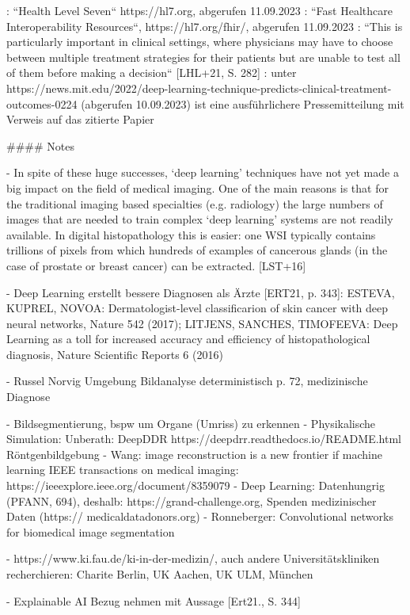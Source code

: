 \footnotemark[26]: ``Health Level Seven`` https://hl7.org, abgerufen 11.09.2023
\footnotemark[27]: ``Fast Healthcare Interoperability Resources``, https://hl7.org/fhir/, abgerufen 11.09.2023
\footnotemark[28]: ``This is particularly important in clinical settings, where physicians may have to choose between multiple treatment strategies for their patients but are unable to test all of them before making a decision``  [LHL+21, S. 282]
\footnotemark[29]: unter https://news.mit.edu/2022/deep-learning-technique-predicts-clinical-treatment-outcomes-0224 (abgerufen 10.09.2023) ist eine ausführlichere Pressemitteilung mit Verweis auf das zitierte Papier


#### Notes

- In spite of these huge successes, ‘deep learning’ techniques have not yet made a big impact on the field of medical imaging. One of the main reasons is that for the traditional imaging based specialties (e.g. radiology) the large numbers of images that are needed to train complex ‘deep learning’ systems are not readily available. In digital
histopathology this is easier: one WSI typically contains trillions of pixels from which hundreds of examples of
cancerous glands (in the case of prostate or breast cancer) can be extracted. [LST+16]


- Deep Learning erstellt bessere Diagnosen als Ärzte [ERT21, p. 343]: ESTEVA, KUPREL, NOVOA: Dermatologist-level classificarion of skin cancer with deep neural networks, Nature 542 (2017); LITJENS, SANCHES, TIMOFEEVA: Deep Learning as a toll for increased accuracy and efficiency of histopathological diagnosis, Nature Scientific Reports 6 (2016)

- Russel Norvig Umgebung Bildanalyse deterministisch p. 72, medizinische Diagnose

- Bildsegmentierung, bspw um Organe (Umriss) zu erkennen
- Physikalische Simulation: Unberath: DeepDDR https://deepdrr.readthedocs.io/README.html Röntgenbildgebung
- Wang: image reconstruction is a new frontier if machine learning IEEE transactions on medical imaging: https://ieeexplore.ieee.org/document/8359079
- Deep Learning: Datenhungrig (PFANN, 694), deshalb: https://grand-challenge.org, Spenden medizinischer Daten (https:// medicaldatadonors.org)
- Ronneberger: Convolutional networks for biomedical image segmentation

- https://www.ki.fau.de/ki-in-der-medizin/, auch andere Universitätskliniken recherchieren: Charite Berlin, UK Aachen, UK ULM, München

- Explainable AI Bezug nehmen mit Aussage [Ert21., S. 344]